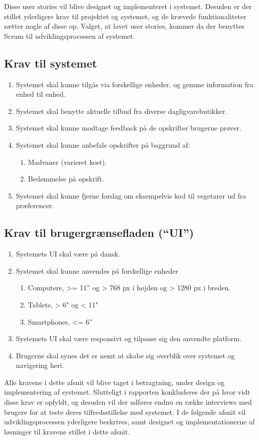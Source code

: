 Disse user stories vil blive designet og implementeret i systemet.
Desuden er der stillet yderligere krav til projektet og systemet, og de krævede funktionaliteter sætter nogle af disse op.
Valget, at lavet user stories, kommer da der benyttes Scrum til udviklingsprocessen af systemet.

\subsection{Krav til systemet}
\begin{enumerate}
\item Systemet skal kunne tilgås via forskellige enheder, og gemme information fra enhed til enhed.
\item Systemet skal benytte aktuelle tilbud fra diverse dagligvarebutikker.
\item Systemet skal kunne modtage feedback på de opskrifter brugerne prøver.
\item Systemet skal kunne anbefale opskrifter på baggrund af:
\begin{enumerate}
	\item Madvaner (varieret kost).
	\item Bedømmelse på opskrift.
\end{enumerate}
\item Systemet skal kunne fjerne forslag om eksempelvis kød til vegetarer ud fra præferencer.
\end{enumerate}

\subsection{Krav til brugergrænsefladen (“UI”)}
\begin{enumerate}
	\item Systemets UI skal være på dansk.
	\item Systemet skal kunne anvendes på forskellige enheder
	\begin{enumerate}
		\item Computere, >= 11” og > 768 px i højden og > 1280 px i breden.
		\item Tablets, > 6" og < 11"
		\item Smartphones, <= 6”
	\end{enumerate}
	\item Systemets UI skal være responsivt og tilpasse sig den anvendte platform.
	\item Brugerne skal synes det er nemt at skabe sig overblik over systemet og navigering heri.
\end{enumerate}

Alle kravene i dette afsnit vil blive taget i betragtning, under design og implementering af systemet.
Slutteligt i rapporten konkluderes der på hvor vidt disse krav er opfyldt, og desuden vil der udføres endnu en række interviews med brugere for at teste deres tilfredsstillelse med systemet. 
I de følgende afsnit vil udviklingsprocessen yderligere beskrives, samt designet og implementationerne af løsninger til kravene stillet i dette afsnit.


